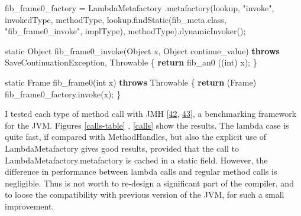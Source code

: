 \documentclass[12pt,a4paper,oneside,openright]{book}
\newenvironment{Shaded}{\begin{snugshade}}{\end{snugshade}}
\newcommand{\KeywordTok}[1]{\textcolor[rgb]{0.13,0.29,0.53}{\textbf{{#1}}}}
\newcommand{\DataTypeTok}[1]{\textcolor[rgb]{0.13,0.29,0.53}{{#1}}}
\newcommand{\StringTok}[1]{\textcolor[rgb]{0.31,0.60,0.02}{{#1}}}
\newcommand{\FunctionTok}[1]{\textcolor[rgb]{0.00,0.00,0.00}{{#1}}}
\newcommand{\NormalTok}[1]{{#1}}
\begin{document}
\begin{Shaded}
\begin{Highlighting}[]
    \NormalTok{fib_frame0_factory}
        \NormalTok{= LambdaMetafactory}
            \NormalTok{.}\FunctionTok{metafactory}\NormalTok{(lookup,}
                         \StringTok{"invoke"}\NormalTok{,}
                         \NormalTok{invokedType,}
                         \NormalTok{methodType,}
                         \NormalTok{lookup.}\FunctionTok{findStatic}\NormalTok{(fib_meta.}\FunctionTok{class}\NormalTok{,}
                                           \StringTok{"fib_frame0_invoke"}\NormalTok{,}
                                           \NormalTok{implType),}
                         \NormalTok{methodType).}\FunctionTok{dynamicInvoker}\NormalTok{();}

    \DataTypeTok{static} \NormalTok{Object }\FunctionTok{fib_frame0_invoke}\NormalTok{(Object x, Object continue_value)}
            \KeywordTok{throws} \NormalTok{SaveContinuationException, Throwable \{}
         \KeywordTok{return} \FunctionTok{fib_an0} \NormalTok{((}\DataTypeTok{int}\NormalTok{) x);}
    \NormalTok{\}}

    \DataTypeTok{static} \NormalTok{Frame }\FunctionTok{fib_frame0}\NormalTok{(}\DataTypeTok{int} \NormalTok{x)}
            \KeywordTok{throws} \NormalTok{Throwable \{}
        \KeywordTok{return} \NormalTok{(Frame) fib_frame0_factory.}\FunctionTok{invoke}\NormalTok{(x);}
    \NormalTok{\}}
\end{Highlighting}
\end{Shaded}

I tested each type of method call with JMH
{[}\hyperref[ref-jmh2015]{42},
\hyperref[ref-BenchmarkingJVM2015]{43}{]}, a benchmarking framework for
the JVM. Figures \ref{calls-table} , \ref{calls} show the results. The
lambda case is quite fast, if compared with MethodHandles, but also the
explicit use of LambdaMetafactory gives good results, provided that the
call to LambdaMetafactory.metafactory is cached in a static field.
However, the difference in performance between lambda calls and regular
method calls is negligible. Thus is not worth to re-design a significant
part of the compiler, and to loose the compatibility with previous
version of the JVM, for such a small improvement.
\end{document}
